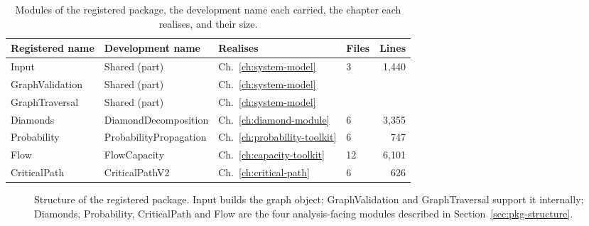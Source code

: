 \documentclass[12pt]{report}
\begin{document}
\begin{table}[htbp]
\centering
\caption{Modules of the registered package, the development name each carried, the chapter
each realises, and their size.}
\label{tab:pkg-modules}
\small
\renewcommand{\arraystretch}{1.15}
\begin{tabular}{llllr}
\toprule
Registered name & Development name & Realises & Files & Lines \\
\midrule
Input & Shared (part) & Ch.~\ref{ch:system-model} & \multirow{3}{*}{3} & \multirow{3}{*}{1,440} \\
GraphValidation & Shared (part) & Ch.~\ref{ch:system-model} & & \\
GraphTraversal & Shared (part) & Ch.~\ref{ch:system-model} & & \\
Diamonds & DiamondDecomposition & Ch.~\ref{ch:diamond-module} & 6 & 3,355 \\
Probability & ProbabilityPropagation & Ch.~\ref{ch:probability-toolkit} & 6 & 747 \\
Flow & FlowCapacity & Ch.~\ref{ch:capacity-toolkit} & 12 & 6,101 \\
CriticalPath & CriticalPathV2 & Ch.~\ref{ch:critical-path} & 6 & 626 \\
\bottomrule
\end{tabular}
\end{table}

\begin{figure}[htbp]
  \centering
  \caption{Structure of the registered package. Input builds the graph object;
  GraphValidation and GraphTraversal support it internally; Diamonds, Probability,
  CriticalPath and Flow are the four analysis-facing modules described in
  Section~\ref{sec:pkg-structure}.}
  \label{fig:pkg-structure}
\end{figure}
\end{document}
